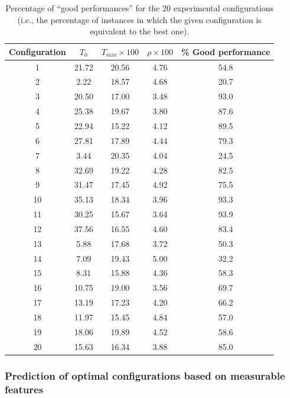 \documentclass[authoryear,12pt]{article}
\begin{document}
{
\renewcommand{\arraystretch}{1.1}
    \renewcommand{\tabcolsep}{2pt}
    \begin{table}
        \caption{Percentage of ``good performances'' for the 20 experimental configurations \label{tab:percent} (i.e., the percentage of instances in which the given configuration is equivalent to the best one).}
        \centering
        \begin{tabular}{ccccc}
        \toprule
     Configuration & \textbf{$T_{0}$} & \textbf{$T_{min} \times 100$} & \textbf{$\rho \times 100$} & \% Good performance\\
      \hline
    1 & 21.72 & 20.56 & 4.76 & 54.8 \\
      2 & 2.22 & 18.57 & 4.68 & 20.7 \\
      3 & 20.50 & 17.00 & 3.48 & 93.0 \\
      4 & 25.38 & 19.67 & 3.80 & 87.6 \\
      5 & 22.94 & 15.22 & 4.12 & 89.5 \\
      6 & 27.81 & 17.89 & 4.44 & 79.3 \\
      7 & 3.44 & 20.35 & 4.04 & 24.5 \\
      8 & 32.69 & 19.22 & 4.28 & 82.5 \\
      9 & 31.47 & 17.45 & 4.92 & 75.5 \\
      10 & 35.13 & 18.34 & 3.96 & 93.3 \\
      11 & 30.25 & 15.67 & 3.64 & 93.9 \\
      12 & 37.56 & 16.55 & 4.60 & 83.4 \\
      13 & 5.88 & 17.68 & 3.72 & 50.3 \\
      14 & 7.09 & 19.43 & 5.00 & 32.2 \\
      15 & 8.31 & 15.88 & 4.36 & 58.3 \\
      16 & 10.75 & 19.00 & 3.56 & 69.7 \\
      17 & 13.19 & 17.23 & 4.20 & 66.2 \\
      18 & 11.97 & 15.45 & 4.84 & 57.0 \\
      19 & 18.06 & 19.89 & 4.52 & 58.6 \\
      20 & 15.63 & 16.34 & 3.88 & 85.0 \\
     \bottomrule
        \end{tabular}
    \end{table}
}


\subsubsection{Prediction of optimal configurations based on
  measurable features}
\end{document}
